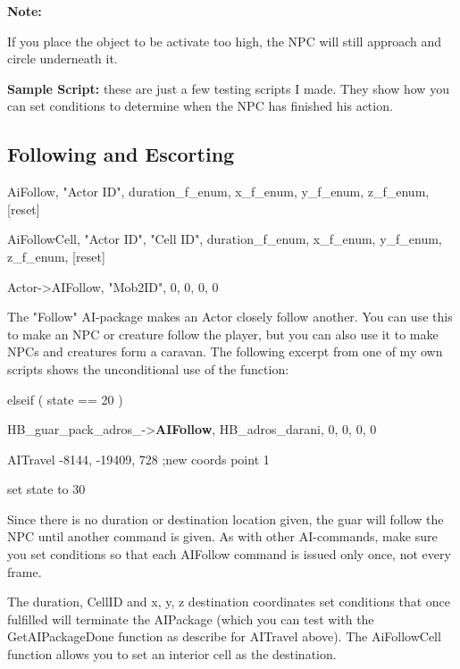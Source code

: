 \textbf{Note:}

If you place the object to be activate too high, the NPC will still
approach and circle underneath it.

\textbf{Sample Script:} these are just a few testing scripts I made.
They show how you can set conditions to determine when the NPC has
finished his action.







\hypertarget{following-and-escorting}{%
\subsection{Following and Escorting}\label{following-and-escorting}}

AiFollow, "Actor ID", duration\_f\_enum, x\_f\_enum, y\_f\_enum,
z\_f\_enum, {[}reset{]}

AiFollowCell, "Actor ID", "Cell ID", duration\_f\_enum, x\_f\_enum,
y\_f\_enum, z\_f\_enum, {[}reset{]}

Actor-\textgreater AIFollow, "Mob2ID", 0, 0, 0, 0

The "Follow" AI-package makes an Actor closely follow another. You can
use this to make an NPC or creature follow the player, but you can also
use it to make NPCs and creatures form a caravan. The following excerpt
from one of my own scripts shows the unconditional use of the function:

elseif ( state == 20 )

HB\_guar\_pack\_adros\_-\textgreater{}\textbf{AIFollow},
HB\_adros\_darani, 0, 0, 0, 0

AITravel -8144, -19409, 728 ;new coords point 1

set state to 30

Since there is no duration or destination location given, the guar will
follow the NPC until another command is given. As with other
AI-commands, make sure you set conditions so that each AIFollow command
is issued only once, not every frame.

The duration, CellID and x, y, z destination coordinates set conditions
that once fulfilled will terminate the AIPackage (which you can test
with the GetAIPackageDone function as describe for AITravel above). The
AiFollowCell function allows you to set an interior cell as the
destination.

